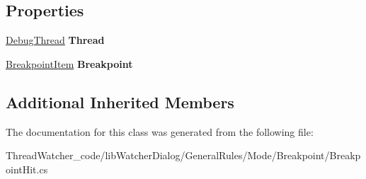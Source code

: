 \subsection*{Properties}
\begin{DoxyCompactItemize}
\item 
\hypertarget{classlib_watcher_dialog_1_1_general_rules_1_1_mode_1_1_breakpoint_1_1_breakpoint_hit_acf7bc08f0401e75dc1ed257f71e4551b}{\hyperlink{classlib_wather_debugger_1_1_thread_1_1_debug_thread}{Debug\+Thread} {\bfseries Thread}}\label{classlib_watcher_dialog_1_1_general_rules_1_1_mode_1_1_breakpoint_1_1_breakpoint_hit_acf7bc08f0401e75dc1ed257f71e4551b}

\item 
\hypertarget{classlib_watcher_dialog_1_1_general_rules_1_1_mode_1_1_breakpoint_1_1_breakpoint_hit_a29827ffb2f25346e750b27b17bfdfe62}{\hyperlink{classlib_watcher_dialog_1_1_property_item_1_1_break_point_1_1_breakpoint_item}{Breakpoint\+Item} {\bfseries Breakpoint}}\label{classlib_watcher_dialog_1_1_general_rules_1_1_mode_1_1_breakpoint_1_1_breakpoint_hit_a29827ffb2f25346e750b27b17bfdfe62}

\end{DoxyCompactItemize}
\subsection*{Additional Inherited Members}


The documentation for this class was generated from the following file\+:\begin{DoxyCompactItemize}
\item 
Thread\+Watcher\+\_\+code/lib\+Watcher\+Dialog/\+General\+Rules/\+Mode/\+Breakpoint/Breakpoint\+Hit.\+cs\end{DoxyCompactItemize}

